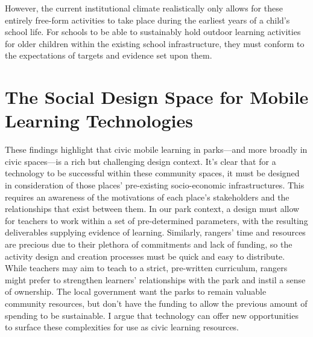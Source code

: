 However, the current institutional climate realistically only allows for these entirely free-form activities to take place during the earliest years of a child’s school life. For schools to be able to sustainably hold outdoor learning activities for older children within the existing school infrastructure, they must conform to the expectations of targets and evidence set upon them.

\section{The Social Design Space for Mobile Learning Technologies}

These findings highlight that civic mobile learning in parks---and more broadly in civic spaces---is a rich but challenging design context. It's clear that for a technology to be successful within these community spaces, it must be designed in consideration of those places' pre-existing socio-economic infrastructures. This requires an awareness of the motivations of each place’s stakeholders and the relationships that exist between them. In our park context, a design must allow for teachers to work within a set of pre-determined parameters, with the resulting deliverables supplying evidence of learning. Similarly, rangers’ time and resources are precious due to their plethora of commitments and lack of funding, so the activity design and creation processes must be quick and easy to distribute. While teachers may aim to teach to a strict, pre-written curriculum, rangers might prefer to strengthen learners’ relationships with the park and instil a sense of ownership. The local government want the parks to remain valuable community resources, but don’t have the funding to allow the previous amount of spending to be sustainable. I argue that technology can offer new opportunities to surface these complexities for use as civic learning resources.

